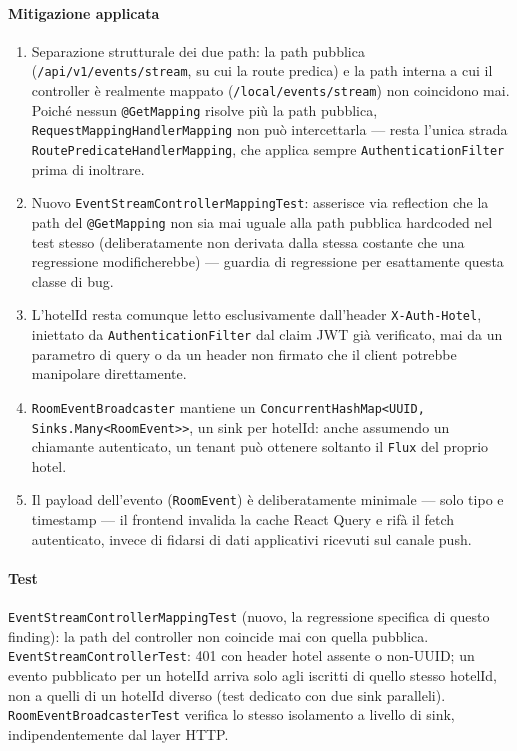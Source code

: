 ﻿\documentclass[a4paper,12pt]{report}
\begin{document}
\paragraph{Mitigazione applicata}
\begin{enumerate}
  \item Separazione strutturale dei due path: la path pubblica
    (\texttt{/api/v1/events/stream}, su cui la route predica) e la path
    interna a cui il controller è realmente mappato
    (\texttt{/local/events/stream}) non coincidono mai. Poiché nessun
    \texttt{@GetMapping} risolve più la path pubblica,
    \texttt{RequestMappingHandlerMapping} non può intercettarla --- resta
    l'unica strada \texttt{RoutePredicateHandlerMapping}, che applica sempre
    \texttt{AuthenticationFilter} prima di inoltrare.
  \item Nuovo \texttt{EventStreamControllerMappingTest}: asserisce via
    reflection che la path del \texttt{@GetMapping} non sia mai uguale alla
    path pubblica hardcoded nel test stesso (deliberatamente non derivata
    dalla stessa costante che una regressione modificherebbe) --- guardia di
    regressione per esattamente questa classe di bug.
  \item L'hotelId resta comunque letto esclusivamente dall'header
    \texttt{X-Auth-Hotel}, iniettato da \texttt{AuthenticationFilter} dal
    claim JWT già verificato, mai da un parametro di query o da un header non
    firmato che il client potrebbe manipolare direttamente.
  \item \texttt{RoomEventBroadcaster} mantiene un
    \texttt{ConcurrentHashMap<UUID, Sinks.Many<RoomEvent>>}, un sink per
    hotelId: anche assumendo un chiamante autenticato, un tenant può ottenere
    soltanto il \texttt{Flux} del proprio hotel.
  \item Il payload dell'evento (\texttt{RoomEvent}) è deliberatamente
    minimale --- solo tipo e timestamp --- il frontend invalida la cache
    React Query e rifà il fetch autenticato, invece di fidarsi di dati
    applicativi ricevuti sul canale push.
\end{enumerate}

\paragraph{Test}
\texttt{EventStreamControllerMappingTest} (nuovo, la regressione specifica di
questo finding): la path del controller non coincide mai con quella pubblica.
\texttt{EventStreamControllerTest}: 401 con header hotel assente o non-UUID;
un evento pubblicato per un hotelId arriva solo agli iscritti di quello stesso
hotelId, non a quelli di un hotelId diverso (test dedicato con due sink
paralleli). \texttt{RoomEventBroadcasterTest} verifica lo stesso isolamento a
livello di sink, indipendentemente dal layer HTTP.
\end{document}
